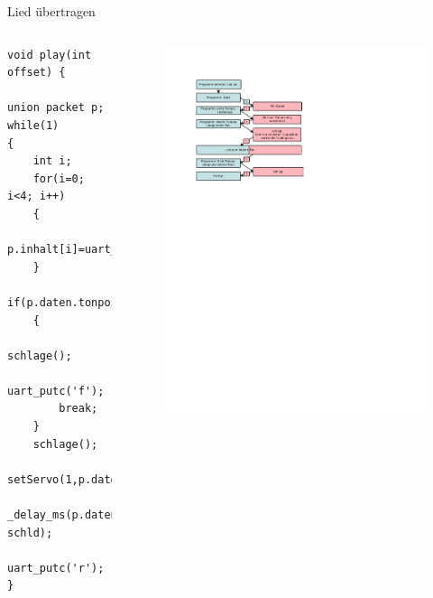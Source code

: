 \begin{frame}[containsverbatim]{Lied übertragen}
\begin{columns}
\column{0.5\paperwidth}
\begin{lstlisting}[tabsize=2]
void play(int offset) {	

union packet p;
while(1)
{
	int i;
	for(i=0; i<4; i++)
	{
		p.inhalt[i]=uart_getc();
	}
	if(p.daten.tonpos_ii==0)
	{
		schlage();
		uart_putc('f');
		break;
	}
	schlage();
	setServo(1,p.daten.tonpos_ii+offset);
	_delay_ms(p.daten.tonlaenge_i-schld);
	uart_putc('r');
}
\end{lstlisting}
\column{0.5\paperwidth}
\vspace{-0.5cm}
\begin{figure}
\center
\includegraphics[trim=6.8cm 53cm 27.8cm 7.5cm, clip=true,width=\textwidth,height=0.8\textheight]{Plots/Diagramm3.pdf}
\end{figure}
\end{columns}
\end{frame}

